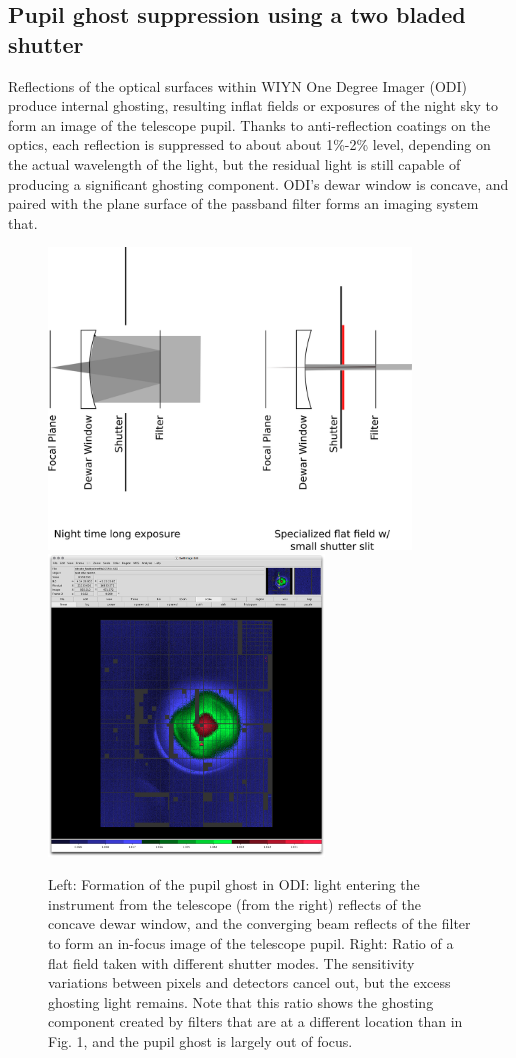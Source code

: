\documentclass[]{spieman}
\begin{document}
\subsection{Pupil ghost suppression using a two bladed shutter}

Reflections of the optical surfaces within WIYN One Degree Imager (ODI) produce
internal ghosting, resulting inflat fields or exposures of the night sky to form
an image of the telescope pupil. Thanks to anti-reflection coatings on the
optics, each reflection is suppressed to about about 1\%-2\% level, depending on
the actual wavelength of the light, but the residual light is still capable of
producing a significant ghosting component. ODI’s dewar window is concave, and
paired with the plane surface of the passband filter forms an imaging system
that.

\begin{figure}
	\includegraphics[height=8cm]{images/odishutterpupilghostsupression.png}
	\hspace{0.5cm} \includegraphics[height=8cm]{images/odi_layeronepg.png}
	
	\caption{ \label{fig_pupilghost}Left: Formation of the pupil ghost in ODI:  light 
		entering the instrument from the telescope (from the right) reflects of the
		concave dewar window, and the converging beam reflects of the filter to
		form an in-focus image of the telescope pupil. Right: Ratio of a flat
		field taken with different shutter modes. The sensitivity variations between
		pixels and detectors cancel out, but the excess ghosting light remains. Note
		that this ratio shows the ghosting component created by filters that are at
		a different location than in Fig. 1, and the pupil ghost is largely out of
		focus.}
\end{figure}
\end{document}
